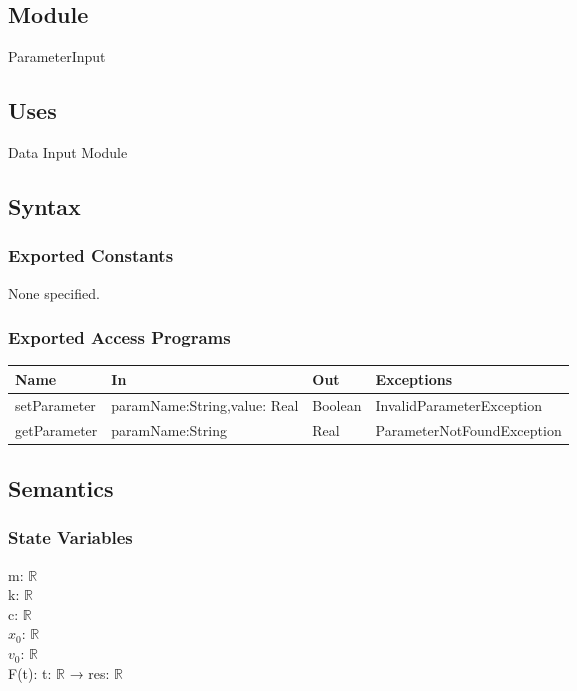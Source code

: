 \documentclass[12pt, titlepage]{article}
\begin{document}
\subsection{Module}
ParameterInput

\subsection{Uses}
Data Input Module

\subsection{Syntax}

\subsubsection{Exported Constants}
None specified.

\subsubsection{Exported Access Programs}

\begin{center}
\begin{tabular}{p{3cm} p{5cm} p{2cm} p{5cm}}
\hline
\textbf{Name} & \textbf{In} & \textbf{Out} & \textbf{Exceptions} \\
\hline
setParameter & paramName:String,value: Real & Boolean & InvalidParameterException \\
getParameter & paramName:String & Real & ParameterNotFoundException \\
\hline
\end{tabular}
\end{center}

\subsection{Semantics}

\subsubsection{State Variables}
m: $\mathbb{R}$\\
k: $\mathbb{R}$\\
c: $\mathbb{R}$\\
$x_0$: $\mathbb{R}$\\
$v_0$: $\mathbb{R}$\\
F(t): t: $\mathbb{R}$ → res: $\mathbb{R}$ %
\end{document}
